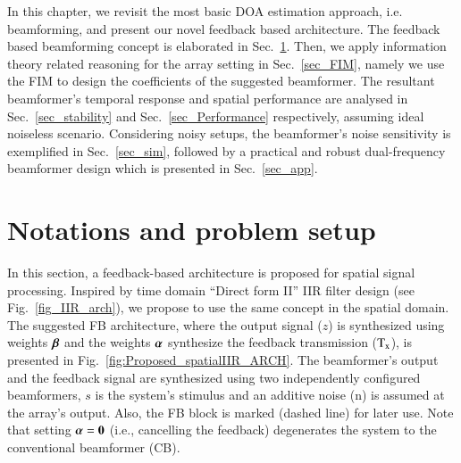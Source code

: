 In this chapter, we revisit the most basic DOA estimation approach, i.e. beamforming, and present our novel feedback based architecture.
The feedback based beamforming concept is elaborated in Sec.~\ref{sec_introduceFeedback}.
Then, we apply information theory related reasoning for the array setting in Sec.~\ref{sec_FIM}, namely we use the FIM to design the coefficients of the suggested beamformer.
The resultant beamformer's temporal response and spatial performance are analysed in Sec.~\ref{sec_stability} and Sec.~\ref{sec_Performance} respectively, assuming ideal noiseless scenario.
Considering noisy setups, the beamformer's noise sensitivity is exemplified in Sec.~\ref{sec_sim}, followed by a practical and robust dual-frequency beamformer design which is presented in Sec.~\ref{sec_app}.

\section{Notations and problem setup}
\label{sec_introduceFeedback}
In this section, a feedback-based architecture is proposed for spatial signal processing.
Inspired by time domain ``Direct form II'' IIR filter design (see Fig.~\ref{fig_IIR_arch}), 
we propose to use the same concept in the spatial domain.
The suggested FB architecture, where the output signal ($z$) is synthesized using weights $\boldsymbol{\beta}$ and the weights $\boldsymbol{\alpha}$ synthesize the feedback transmission ($\text{T}_{\text{x}}$), is presented in Fig.~\ref{fig:Proposed_spatialIIR_ARCH}. The beamformer's output and the feedback signal are synthesized using two independently configured beamformers, $s$ is the system's stimulus and an additive noise (n) is assumed at the array's output.
Also, the FB block is marked (dashed line) for later use.
Note that setting $\boldsymbol{\alpha}=\boldsymbol{0}$ (i.e., cancelling the feedback) degenerates the system to the conventional beamformer (CB).
